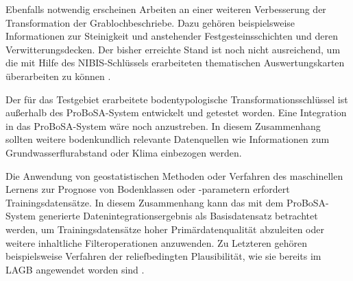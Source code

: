 Ebenfalls notwendig erscheinen Arbeiten an einer weiteren Verbesserung der Transformation der Grablochbeschriebe. Dazu gehören beispielsweise Informationen zur Steinigkeit und anstehender Festgesteinsschichten und deren Verwitterungsdecken. Der bisher erreichte Stand ist noch nicht ausreichend, um die mit Hilfe des NIBIS-Schlüssels \citep{NBIS2003} erarbeiteten thematischen Auswertungskarten  überarbeiten zu können \citep{Hartmann2006}.\

Der für das Testgebiet erarbeitete bodentypologische Transformationsschlüssel ist außerhalb des ProBoSA-System entwickelt und getestet worden. Eine Integration in das ProBoSA-System wäre noch anzustreben. In diesem Zusammenhang sollten weitere bodenkundlich relevante Datenquellen wie Informationen zum Grundwasserflurabstand oder Klima einbezogen werden.\

Die Anwendung von geostatistischen Methoden oder Verfahren des maschinellen Lernens zur Prognose von Bodenklassen oder -parametern erfordert Trainingsdatensätze. In diesem Zusammenhang kann das mit dem ProBoSA-System generierte Datenintegrationsergebnis als Basisdatensatz betrachtet werden, um Trainingsdatensätze hoher Primärdatenqualität abzuleiten oder weitere inhaltliche Filteroperationen anzuwenden. Zu Letzteren gehören beispielsweise Verfahren der reliefbedingten Plausibilität, wie sie bereits im LAGB angewendet worden sind \citep[vgl. Kap. \ref{sec:dsm}; ][]{Moeller-etal2012catena,Hartmann2014}.


